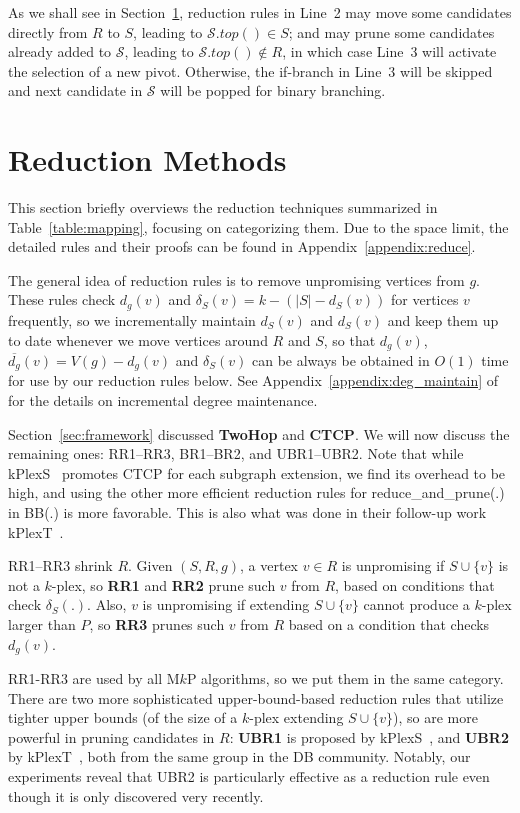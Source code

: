\documentclass[sigconf, nonacm]{acmart}
\begin{document}
As we shall see in Section~\ref{sec:reduce}, reduction rules in Line~2 may move some candidates directly from $R$ to $S$, leading to $\mathcal{S}.top()\in S$; and may prune some candidates already added to $\mathcal{S}$, leading to $\mathcal{S}.top()\notin R$, in which case Line~3 will activate the selection of a new pivot. Otherwise, the if-branch in Line~3 will be skipped and next candidate in $\mathcal{S}$ will be popped for binary branching.

\vspace{-2mm}
\section{Reduction Methods}\label{sec:reduce}
This section briefly overviews the reduction techniques summarized in Table~\ref{table:mapping}, focusing on categorizing them. Due to the space limit, the detailed rules and their proofs can be found in Appendix~\ref{appendix:reduce}.

The general idea of reduction rules is to remove unpromising vertices from $g$. These rules check $d_g(v)$ and $\delta_S(v)=k-(|S|-d_S(v))$ for vertices $v$ frequently, so we incrementally maintain $d_S(v)$ and $d_S(v)$ and keep them up to date whenever we move vertices around $R$ and $S$, so that $d_g(v)$, $\overline{d_g}(v)=V(g)-d_g(v)$ and $\delta_S(v)$ can be always be obtained in $O(1)$ time for use by our reduction rules below. See Appendix~\ref{appendix:deg_maintain} of~\cite{tech_report} for the details on  incremental degree maintenance.

Section~\ref{sec:framework} discussed  {\bf TwoHop} and  {\bf CTCP}. We will now discuss the remaining ones: RR1--RR3, BR1--BR2, and UBR1--UBR2. Note that while kPlexS~\cite{kPlexS} promotes CTCP for each subgraph extension, we find its overhead to be high, and using the other more efficient reduction rules for reduce\_and\_prune(.) in BB(.) is more favorable. This is also what was done in their follow-up work kPlexT~\cite{kPlexT}.

RR1--RR3 shrink $R$. Given $(S, R, g)$, a vertex $v\in R$ is unpromising if $S\cup \{v\}$ is not a $k$-plex, so  {\bf RR1} and  {\bf RR2} prune such $v$ from $R$, based on conditions that check $\delta_S(.)$. Also, $v$ is unpromising if extending $S\cup \{v\}$ cannot produce a $k$-plex larger than $P$, so  {\bf RR3} prunes such $v$ from $R$ based on a condition that checks $d_g(v)$.

RR1-RR3 are used by all M$k$P algorithms, so we put them in the same category. There are two more sophisticated upper-bound-based reduction rules that utilize tighter upper bounds (of the size of a $k$-plex extending $S\cup \{v\}$), so are more powerful in pruning candidates in $R$:  {\bf UBR1} is proposed by kPlexS~\cite{kPlexS}, and {\bf UBR2} by kPlexT~\cite{kPlexT}, both from the same group in the DB community. Notably, our experiments reveal that UBR2 is particularly effective as a reduction rule even though it is only discovered very recently.
\end{document}
